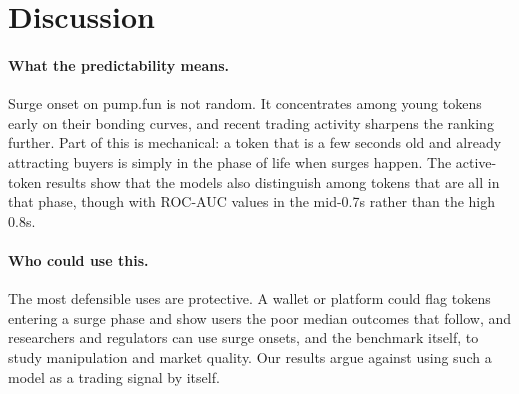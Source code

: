 \section{Discussion}
\label{sec:discussion}

\paragraph{What the predictability means.}
Surge onset on pump.fun is not random. It concentrates among young tokens early on their bonding curves, and recent trading activity sharpens the ranking further. Part of this is mechanical: a token that is a few seconds old and already attracting buyers is simply in the phase of life when surges happen. The active-token results show that the models also distinguish among tokens that are all in that phase, though with ROC-AUC values in the mid-0.7s rather than the high 0.8s.

\paragraph{Who could use this.}
The most defensible uses are protective. A wallet or platform could flag tokens entering a surge phase and show users the poor median outcomes that follow, and researchers and regulators can use surge onsets, and the benchmark itself, to study manipulation and market quality. Our results argue against using such a model as a trading signal by itself.


